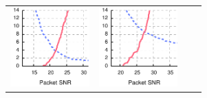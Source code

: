 \begin{figure}[p]
\begin{leftfullpage}
\begin{tabular}{cccc}
	\includegraphics[height=1.2in]{figures/delivery/goodbad/packet_snr_goodbad_6.pdf} &
	\includegraphics[height=1.2in]{figures/delivery/goodbad/packet_snr_goodbad_7.pdf} \\


\end{tabular}
\end{leftfullpage}
\end{figure}
